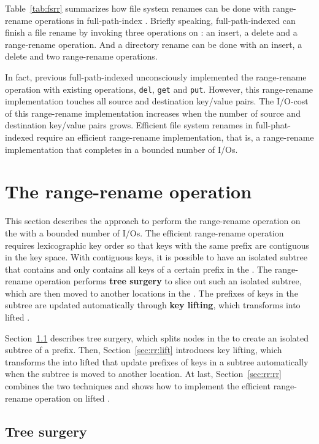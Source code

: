 Table~\ref{tab:fsrr} summarizes how file system renames can be done with
range-rename operations in full-path-index \betrfs.
Briefly speaking, full-path-indexed \betrfs can finish a file rename by
invoking three operations on \bets: an insert, a delete and a range-rename
operation.
And a directory rename can be done with an insert, a delete and two
range-rename operations.

In fact, previous full-path-indexed \betrfs unconsciously implemented the
range-rename operation with existing \bet operations,
\texttt{del}, \texttt{get} and \texttt{put}.
However, this range-rename implementation touches all source and destination
key/value pairs.
The I/O-cost of this range-rename implementation increases
when the number of source and destination key/value pairs grows.
Efficient file system renames in full-phat-indexed \betrfs require an efficient
range-rename implementation, that is, a range-rename implementation that
completes in a bounded number of I/Os.

\section{The range-rename operation}
\label{sec:rr}

This section describes the approach to perform the range-rename operation on the
\bet with a bounded number of I/Os.
The efficient range-rename operation requires lexicographic key order so that
keys with the same prefix are contiguous in the key space.
With contiguous keys, it is possible to have an isolated subtree that contains
and only contains all keys of a certain prefix in the \bet.
The range-rename operation performs \textbf{tree surgery} to slice out such an
isolated subtree, which are then moved to another locations in the \bet.
The prefixes of keys in the subtree are updated automatically through
\textbf{key lifting}, which transforms \bets into lifted \bets.

Section~\ref{sec:rr:surgery} describes tree surgery, which splits nodes in the
\bet to create an isolated subtree of a prefix.
Then, Section~\ref{sec:rr:lift} introduces key lifting, which transforms the
\bets into lifted \bets that update prefixes of keys in a subtree
automatically when the subtree is moved to another location.
At last, Section~\ref{sec:rr:rr} combines the two techniques and shows how
to implement the efficient range-rename operation on lifted \bets.

\subsection{Tree surgery}
\label{sec:rr:surgery}

